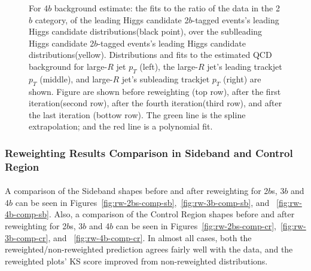\begin{figure}[htbp!]
\begin{center}
\caption{For 4$b$ background estimate: the fits to the ratio of the data in the 2$b$ category, of the leading Higgs candidate 2$b$-tagged events's leading Higgs candidate distributions(black point), over the sublleading Higgs candidate 2$b$-tagged events's leading Higgs candidate distributions(yellow). Distributions and fits to the estimated QCD background for large-$R$ jet $p_{T}$ (left),  the large-$R$ jet's leading trackjet $p_T$ (middle), and large-$R$ jet's subleading trackjet $p_T$ (right) are shown.  Figure are shown before reweighting (top row), after the first iteration(second row), after the fourth iteration(third row), and after the last iteration (bottow row). The green line is the spline extrapolation; and the red line is a polynomial fit.}
\label{fig:rw-4b-subl}
\end{center}
\end{figure}


\pagebreak{}
\subsubsection{Reweighting Results Comparison in Sideband and Control Region}
\label{sec:boosted-Reweight-compare}

\paragraph{}
A comparison of the Sideband shapes before and after reweighting for 2$b$s, 3$b$ and 4$b$ can be seen in Figures~\ref{fig:rw-2bs-comp-sb},~\ref{fig:rw-3b-comp-sb}, and ~\ref{fig:rw-4b-comp-sb}. Also, a comparison of the Control Region shapes before and after reweighting for 2$b$s, 3$b$ and 4$b$ can be seen in Figures~\ref{fig:rw-2bs-comp-cr},~\ref{fig:rw-3b-comp-cr}, and ~\ref{fig:rw-4b-comp-cr}. In almost all cases, both the reweighted/non-reweighted prediction agrees fairly well with the data, and the reweighted plots' KS score improved from non-reweighted distributions. 

